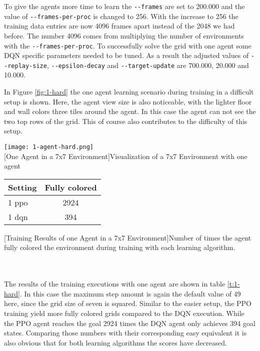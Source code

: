 To give the agents more time to learn the \verb|--frames| are set to 200.000 and the value of \verb|--frames-per-proc| is changed to 256. With the increase to 256 the training data entries are now 4096 frames apart instead of the 2048 we had before. The number 4096 comes from multiplying the number of environments with the \verb|--frames-per-proc|. To successfully solve the grid with one agent some DQN specific parameters needed to be tuned. As a result the adjusted values of \verb|--replay-size|, \verb|--epsilon-decay| and \verb|--target-update| are 700.000, 20.000 and 10.000. 

In Figure \ref{fig:1-hard} the one agent learning scenario during training in a difficult setup is shown. Here, the agent view size is also noticeable, with the lighter floor and wall colors three tiles around the agent. In this case the agent can not see the two top rows of the grid. This of course also contributes to the difficulty of this setup. \\

\begin{minipage}{\textwidth}
  \begin{minipage}[b]{0.29\textwidth}
    \centering
    \texttt{[image: 1-agent-hard.png]}\\
    [One Agent in a 7x7 Environment]{Visualization of a 7x7 Environment with one agent}\label{fig:1-hard}
  \end{minipage}
  \hfill
  \begin{minipage}[b]{0.69\textwidth}
    \centering
    \begin{tabular}{lc}\hline
      Setting & Fully colored \\ \hline
        1 ppo & 2924 \\
        1 dqn & 394 \\ \hline
      \end{tabular}
      [Training Results of one Agent in a 7x7 Environment]{Number of times the agent fully colored the environment during training with each learning algorithm.\\ }\label{t:1-hard}
    \end{minipage}
  \end{minipage}\\\\

The results of the training executions with one agent are shown in table \ref{t:1-hard}. In this case the maximum step amount is again the default value of 49 here, since the grid size of seven is squared. Similar to the easier setup, the PPO training yield more fully colored grids compared to the DQN execution. While the PPO agent reaches the goal 2924 times the DQN agent only achieves 394 goal states. Comparing those numbers with their corresponding easy equivalent it is also obvious that for both learning algorithms the scores have decreased.

